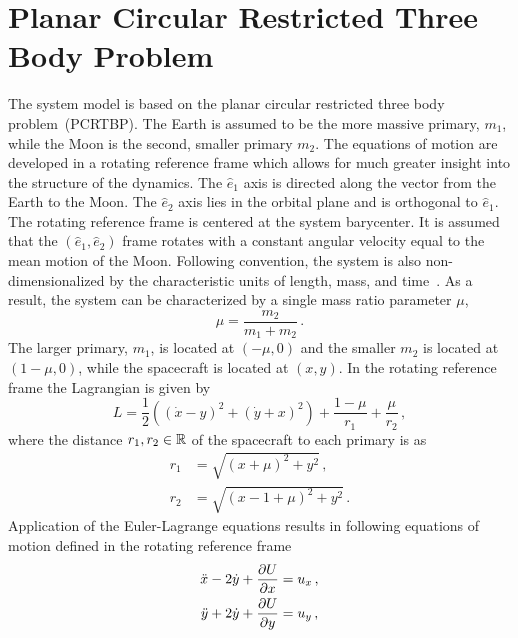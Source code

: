 \documentclass[preprint]{elsarticle}
\begin{document}
\section{Planar Circular Restricted Three Body Problem}\label{sec:pcrtbp}
The system model is based on the planar circular restricted three body problem~(PCRTBP).
The Earth is assumed to be the more massive primary, \( m_1 \), while the Moon is the second, smaller primary \( m_2\).
The equations of motion are developed in a rotating reference frame which allows for much greater insight into the structure of the dynamics.
The \( \hat{e}_1 \) axis is directed along the vector from the Earth to the Moon.
The \( \hat{e}_2 \) axis lies in the orbital plane and is orthogonal to \( \hat{e}_1 \).
The rotating reference frame is centered at the system barycenter.
It is assumed that the \(\left( \hat{e}_1, \hat{e}_2\right)\) frame rotates with a constant angular velocity equal to the mean motion of the Moon.
Following convention, the system is also non-dimensionalized by the characteristic units of length, mass, and time~\cite{koon2011}.
As a result, the system can be characterized by a single mass ratio parameter \( \mu \),
\begin{equation}
	\mu = \frac{m_2}{m_1+m_2} \, .
	\label{eq:mass_param}
\end{equation}
The larger primary, \(m_1\), is located at \( \left(  -\mu , 0 \right)\) and the smaller \( m_2\) is located at \( \left( 1-\mu , 0 \right)\), while the spacecraft is located at \( (x ,y) \).
In the rotating reference frame the Lagrangian is given by
\begin{equation}
	L = \frac{1}{2} \left( \left( \dot{x} -y \right)^2 + \left( \dot{y} + x \right)^2 \right) + \frac{1-\mu}{r_1} + \frac{\mu}{r_2}\, ,
	\label{eq:lagrangian}
\end{equation}
where the distance \( r_1, r_2 \in \mathbb{R} \) of the spacecraft to each primary is as
\begin{align}
	r_1 &= \sqrt{\left( x + \mu\right)^2 + y^2}\, , \\
	r_2 &= \sqrt{\left( x - 1 + \mu\right)^2 + y^2}\, .
	\label{eq:distances}
\end{align}
Application of the Euler-Lagrange equations results in following equations of motion defined in the rotating reference frame
\begin{align}
	\ddot{x} - 2 \dot{y} + \frac{\partial U}{\partial x} &= u_x \, ,\nonumber \\
	\ddot{y} + 2 \dot{y} + \frac{\partial U}{\partial y} &= u_y \, ,
	\label{eq:cont_eom}
\end{align}
\end{document}
